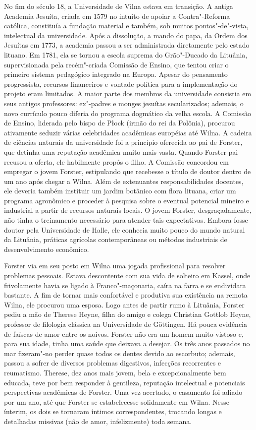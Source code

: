 No fim do século 18, a Universidade de Vilna estava em transição. A
antiga Academia Jesuíta, criada em 1579 no intuito de apoiar a
Contra"-Reforma católica, constituía a fundação material e também, sob
muitos pontos"-de"-vista, intelectual da universidade. Após a dissolução,
a mando do papa, da Ordem dos Jesuítas em 1773, a academia passou a ser
administrada diretamente pelo estado lituano. Em 1781, ela se tornou a
escola suprema do Grão"-Ducado da Lituânia, supervisionada pela
recém"-criada Comissão de Ensino, que tentou criar o primeiro sistema
pedagógico integrado na Europa. Apesar do pensamento progressista,
recursos financeiros e vontade política para a implementação do projeto
eram limitados. A maior parte dos membros da universidade consistia em
seus antigos professores: ex"-padres e monges jesuítas secularizados;
ademais, o novo currículo pouco diferia do programa dogmático da velha
escola. A Comissão de Ensino, liderada pelo bispo de Płock (irmão do rei
da Polônia), procurou ativamente seduzir várias celebridades acadêmicas
européias até Wilna. A cadeira de ciências naturais da universidade foi
a princípio oferecida ao pai de Forster, que detinha uma reputação
acadêmica muito mais vasta. Quando Forster pai recusou a oferta, ele
habilmente propôs o filho. A Comissão concordou em empregar o jovem
Forster, estipulando que recebesse o título de doutor dentro de um ano
após chegar a Wilna. Além de extenuantes responsabilidades docentes, ele
deveria também instituir um jardim botânico com flora lituana, criar um
programa agronômico e proceder à pesquisa sobre o eventual potencial
mineiro e industrial a partir de recursos naturais locais. O jovem
Forster, desgraçadamente, não tinha o treinamento necessário para
atender tais expectativas. Embora fosse doutor pela Universidade de
Halle, ele conhecia muito pouco do mundo natural da Lituânia, práticas
agrícolas contemporâneas ou métodos industriais de desenvolvimento
econômico.

Forster via em seu posto em Wilna uma jogada profissional para resolver
problemas pessoais. Estava descontente com sua vida de solteiro em
Kassel, onde frivolamente havia se ligado à Franco"-maçonaria, caíra na
farra e se endividara bastante. A fim de tornar mais confortável e
produtiva sua existência na remota Wilna, ele procurou uma esposa. Logo
antes de partir rumo à Lituânia, Forster pediu a mão de Therese Heyne,
filha do amigo e colega Christian Gottlob Heyne, professor de filologia
clássica na Universidade de Göttingen. Há pouca evidência de faíscas de
amor entre os noivos. Forster não era um homem muito vistoso e, para sua
idade, tinha uma saúde que deixava a desejar. Os três anos passados no
mar fizeram"-no perder quase todos os dentes devido ao escorbuto;
ademais, passou a sofrer de diversos problemas digestivos, infecções
recorrentes e reumatismo. Therese, dez anos mais jovem, bela e
excepcionalmente bem educada, teve por bem responder à gentileza,
reputação intelectual e potenciais perspectivas acadêmicas de Forster.
Uma vez acertado, o casamento foi adiado por um ano, até que Forster se
estabelecesse solidamente em Wilna. Nesse ínterim, os dois se tornaram
íntimos correspondentes, trocando longas e detalhadas missivas (não de
amor, infelizmente) toda semana.

